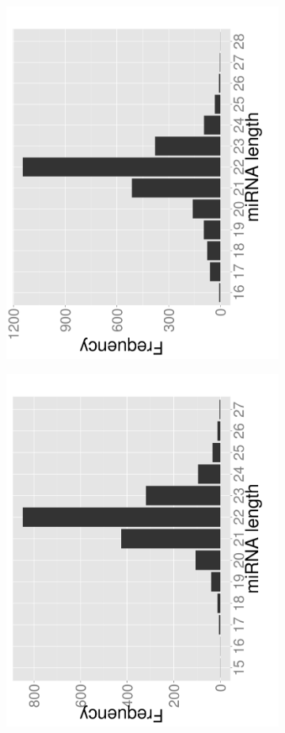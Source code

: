\documentclass{article}
\begin{document}
\begin{figure}[t]
   \centering
   \begin{subfigure}{.5\textwidth}
      \centering
      \includegraphics[width=.7\textwidth,natwidth=100,natheight=100,angle=270]{human_mirbase_length.pdf}
      \caption{}
      \label{fig:human_mirna_length}
   \end{subfigure}%
   \begin{subfigure}{.5\textwidth}
      \centering
      \includegraphics[width=.7\textwidth,natwidth=100,natheight=100,angle=270]{mouse_mirbase_length.pdf}

\end{subfigure}
\end{figure}
\end{document}
